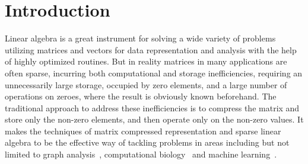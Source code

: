 \documentclass[acmsmall,review,nonacm]{acmart}\settopmatter{printfolios=true,printccs=false,printacmref=false}
\begin{document}



\maketitle

\section{Introduction}
Linear algebra is a great instrument for solving a wide variety of problems utilizing matrices and vectors for data representation and analysis with the help of highly optimized routines. But in reality matrices in many applications are often sparse, incurring both computational and storage inefficiencies, requiring an unnecessarily large storage, occupied by zero elements, and a large number of operations on zeroes, where the result is obviously known beforehand. 
The traditional approach to address these inefficiencies is to compress the
matrix and store only the non-zero elements, and then operate only
on the non-zero values.
It makes the techniques of matrix compressed representation and sparse linear algebra to be the effective way of tackling problems in areas including but not limited to graph analysis~\cite{GAILLA}, computational biology~\cite{compBio} and machine learning~\cite{Kepner_2017}.


\end{document}

